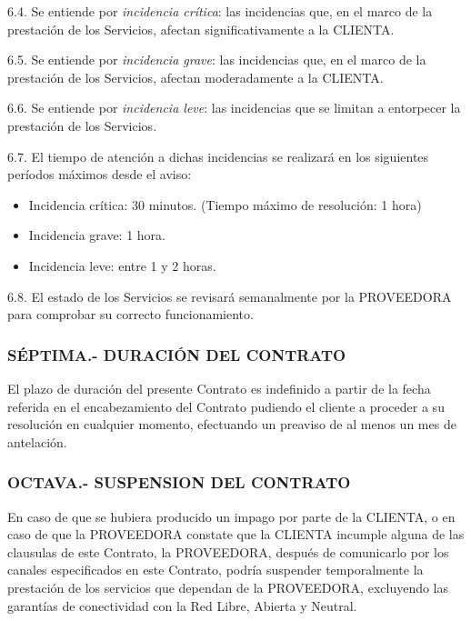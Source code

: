 \documentclass[11pt,spanish,a4paper,]{article}
\begin{document}
6.4. Se entiende por \emph{incidencia crítica}: las incidencias que, en
el marco de la prestación de los Servicios, afectan significativamente a
la CLIENTA.

6.5. Se entiende por \emph{incidencia grave}: las incidencias que, en el
marco de la prestación de los Servicios, afectan moderadamente a la
CLIENTA.

6.6. Se entiende por \emph{incidencia leve}: las incidencias que se
limitan a entorpecer la prestación de los Servicios.

6.7. El tiempo de atención a dichas incidencias se realizará en los
siguientes períodos máximos desde el aviso:

\begin{itemize}
\itemsep1pt\parskip0pt
\item
  Incidencia crítica: 30 minutos. (Tiempo máximo de resolución: 1 hora)
\item
  Incidencia grave: 1 hora.
\item
  Incidencia leve: entre 1 y 2 horas.
\end{itemize}

6.8. El estado de los Servicios se revisará semanalmente por la
PROVEEDORA para comprobar su correcto funcionamiento.

\subsubsection{SÉPTIMA.- DURACIÓN DEL
CONTRATO}\label{suxe9ptima.--duraciuxf3n-del-contrato}

El plazo de duración del presente Contrato es indefinido a partir de la
fecha referida en el encabezamiento del Contrato pudiendo el cliente a
proceder a su resolución en cualquier momento, efectuando un preaviso de
al menos un mes de antelación.

\subsubsection{OCTAVA.- SUSPENSION DEL
CONTRATO}\label{octava.--suspension-del-contrato}

En caso de que se hubiera producido un impago por parte de la CLIENTA, o
en caso de que la PROVEEDORA constate que la CLIENTA incumple alguna de
las clausulas de este Contrato, la PROVEEDORA, después de comunicarlo
por los canales especificados en este Contrato, podría suspender
temporalmente la prestación de los servicios que dependan de la
PROVEEDORA, excluyendo las garantías de conectividad con la Red Libre,
Abierta y Neutral.
\end{document}

